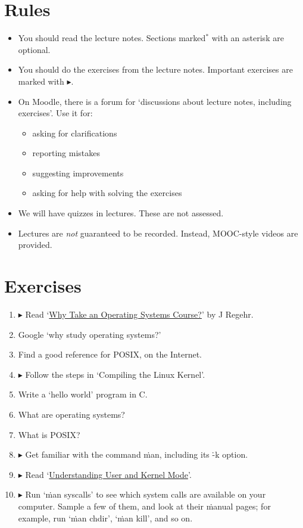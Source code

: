 \section{Rules}

\begin{itemize}
\item
  You should read the lecture notes.
  Sections marked$^\ast$ with an asterisk are optional.
\item
  You should do the exercises from the lecture notes.
  Important exercises are marked with $\blacktriangleright$.
\item
  On Moodle,
    there is a forum for `discussions about lecture notes, including exercises'.
  Use it for:
  \begin{itemize}
  \item asking for clarifications
  \item reporting mistakes
  \item suggesting improvements
  \item asking for help with solving the exercises
  \end{itemize}
\item
  We will have quizzes in lectures.
  These are not assessed.
\item
  Lectures are \emph{not} guaranteed to be recorded.
  Instead, MOOC-style videos are provided.
\end{itemize}

\section{Exercises}

\begin{enumerate}
\item
  $\blacktriangleright$
  Read  `\href{http://blog.regehr.org/archives/164}{Why Take an Operating Systems Course?}'
    by J Regehr.
\item Google `why study operating systems?'
\item Find a good reference for POSIX, on the Internet.
\item
  $\blacktriangleright$
  Follow the steps in `Compiling the Linux Kernel'.
\item Write a `hello world' program in C.
\item What are operating systems?
\item What is POSIX?
\item
  $\blacktriangleright$
  Get familiar with the command \.{man}, including its \.{-k} option.
\item
  $\blacktriangleright$
  Read `\href{http://blog.codinghorror.com/understanding-user-and-kernel-mode/}{Understanding User and Kernel Mode}'.
\item
  $\blacktriangleright$
  Run `\.{man syscalls}' to see which system calls are available on your computer.
  Sample a few of them, and look at their \.{man}ual pages;
  for example, run
    `\.{man chdir}',
    `\.{man kill}',
    and so on.
\end{enumerate}

